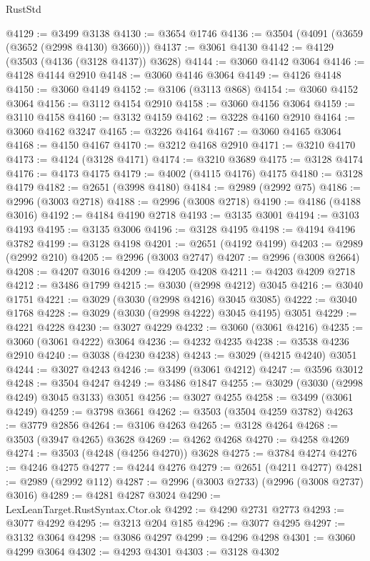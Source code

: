 \begin{lexlean}{RustStd}
\begin{coremodule}
@4129 := @3499 @3138
@4130 := @3654 @1746
@4136 := @3504 (@4091 (@3659 (@3652 (@2998 @4130) @3660)))
@4137 := @3061 @4130
@4142 := @4129 (@3503 (@4136 (@3128 @4137)) @3628)
@4144 := @3060 @4142 @3064
@4146 := @4128 @4144 @2910
@4148 := @3060 @4146 @3064
@4149 := @4126 @4148
@4150 := @3060 @4149
@4152 := @3106 (@3113 @868)
@4154 := @3060 @4152 @3064
@4156 := @3112 @4154 @2910
@4158 := @3060 @4156 @3064
@4159 := @3110 @4158
@4160 := @3132 @4159
@4162 := @3228 @4160 @2910
@4164 := @3060 @4162 @3247
@4165 := @3226 @4164
@4167 := @3060 @4165 @3064
@4168 := @4150 @4167
@4170 := @3212 @4168 @2910
@4171 := @3210 @4170
@4173 := @4124 (@3128 @4171)
@4174 := @3210 @3689
@4175 := @3128 @4174
@4176 := @4173 @4175
@4179 := @4002 (@4115 @4176) @4175
@4180 := @3128 @4179
@4182 := @2651 (@3998 @4180)
@4184 := @2989 (@2992 @75)
@4186 := @2996 (@3003 @2718)
@4188 := @2996 (@3008 @2718)
@4190 := @4186 (@4188 @3016)
@4192 := @4184 @4190 @2718
@4193 := @3135 @3001
@4194 := @3103 @4193
@4195 := @3135 @3006
@4196 := @3128 @4195
@4198 := @4194 @4196 @3782
@4199 := @3128 @4198
@4201 := @2651 (@4192 @4199)
@4203 := @2989 (@2992 @210)
@4205 := @2996 (@3003 @2747)
@4207 := @2996 (@3008 @2664)
@4208 := @4207 @3016
@4209 := @4205 @4208
@4211 := @4203 @4209 @2718
@4212 := @3486 @1799
@4215 := @3030 (@2998 @4212) @3045
@4216 := @3040 @1751
@4221 := @3029 (@3030 (@2998 @4216) @3045 @3085)
@4222 := @3040 @1768
@4228 := @3029 (@3030 (@2998 @4222) @3045 @4195) @3051
@4229 := @4221 @4228
@4230 := @3027 @4229
@4232 := @3060 (@3061 @4216)
@4235 := @3060 (@3061 @4222) @3064
@4236 := @4232 @4235
@4238 := @3538 @4236 @2910
@4240 := @3038 (@4230 @4238)
@4243 := @3029 (@4215 @4240) @3051
@4244 := @3027 @4243
@4246 := @3499 (@3061 @4212)
@4247 := @3596 @3012
@4248 := @3504 @4247
@4249 := @3486 @1847
@4255 := @3029 (@3030 (@2998 @4249) @3045 @3133) @3051
@4256 := @3027 @4255
@4258 := @3499 (@3061 @4249)
@4259 := @3798 @3661
@4262 := @3503 (@3504 @4259 @3782)
@4263 := @3779 @2856
@4264 := @3106 @4263
@4265 := @3128 @4264
@4268 := @3503 (@3947 @4265) @3628
@4269 := @4262 @4268
@4270 := @4258 @4269
@4274 := @3503 (@4248 (@4256 @4270)) @3628
@4275 := @3784 @4274
@4276 := @4246 @4275
@4277 := @4244 @4276
@4279 := @2651 (@4211 @4277)
@4281 := @2989 (@2992 @112)
@4287 := @2996 (@3003 @2733) (@2996 (@3008 @2737) @3016)
@4289 := @4281 @4287 @3024
@4290 := LexLeanTarget.RustSyntax.Ctor.ok
@4292 := @4290 @2731 @2773
@4293 := @3077 @4292
@4295 := @3213 @204 @185
@4296 := @3077 @4295
@4297 := @3132 @3064
@4298 := @3086 @4297
@4299 := @4296 @4298
@4301 := @3060 @4299 @3064
@4302 := @4293 @4301
@4303 := @3128 @4302

\end{coremodule}
\end{lexlean}
